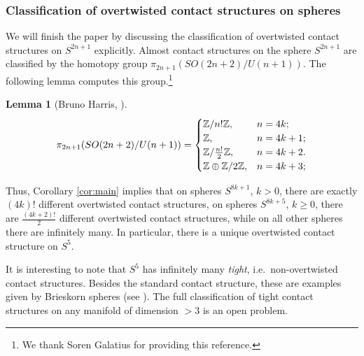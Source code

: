 \documentclass[12pt]{paper}
\theoremstyle{plain}
\newtheorem{lemma}[theorem]{Lemma}
\theoremstyle{definition}
\newcommand{\Z}{{\mathbb{Z}}}
\numberwithin{figure}{section}
\begin{document}
\subsubsection*{Classification of overtwisted contact structures on spheres}
 We will finish the paper by discussing the classification of overtwisted contact structures on $S^{2n+1}$ explicitly. Almost contact structures on the sphere $S^{2n+1}$ are classified by the homotopy group $\pi_{2n+1}(SO(2n+2)/U(n+1))$.
 The following lemma  computes  this group.\footnote{We thank Soren Galatius for providing this reference.}
 \begin{lemma}[Bruno Harris, \cite{Harris}]
 \label{lm:comput-sphere}  
 $$\pi_{2n+1}( SO(2n+2)/U(n+1))=\begin{cases}
 \Z/n!\Z,& n=4k;\cr
\Z,& n=4k+1;\cr
\Z/\frac{n!}2\Z,& n=4k+2.\cr
 \Z\oplus\Z/2\Z, & n=4k+3;\cr
 \end{cases}
 $$
  \end{lemma}
 
   
   
 
Thus,  Corollary \ref{cor:main}   implies that
  on spheres $S^{8k+1}$, $k>0$, there are exactly  $(4k)!$  different  overtwisted contact structures, on spheres $S^{8k+5}$, $k\geq 0$, there are $\frac{(4k+2)!}2$ different   overtwisted contact structures, while on all other spheres there are infinitely many. In  particular, there is a unique overtwisted contact structure on $S^5$. 
  
  It is interesting to note that
  $S^5$ has  infinitely many  
 {\it tight}, i.e.\ non-overtwisted contact structures. Besides  the standard contact structure,  these  are   examples  given  by  Brieskorn spheres (see \cite{Ust}).
 The full classification of tight contact structures on  any manifold of dimension $>3$  is an open problem.
 
\end{document}
